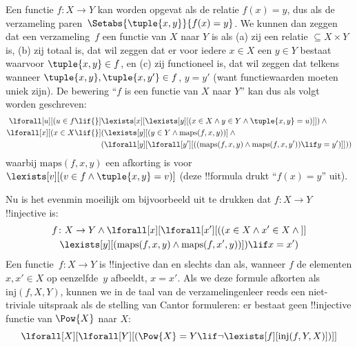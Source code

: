 \documentclass[../../../include/open-logic-section]{subfiles}
\begin{document}
Een functie $f \colon X \to Y$ kan worden opgevat als de relatie $f(x)
= y$, dus als de verzameling paren~$\Setabs{\tuple{x,y}}{f(x) = y}$.
We kunnen dan zeggen dat een verzameling~$f$ een functie van $X$ naar
$Y$ is als (a) zij een relatie $\subseteq X \times Y$ is, (b) zij
totaal is, dat wil zeggen dat er voor iedere $x \in X$ een $y \in Y$
bestaat waarvoor $\tuple{x, y} \in f$, en (c) zij functioneel is, dat
wil zeggen dat telkens wanneer $\tuple{x, y}, \tuple{x, y'} \in f$,
$y = y'$ (want functiewaarden moeten uniek zijn). De bewering ``$f$ is
een functie van $X$ naar $Y$'' kan dus als volgt worden geschreven:
\begin{align*}
 \lforall[u][(u \in f \lif {}] & \lexists[x][\lexists[y][(x \in X \land y \in
      Y \land \tuple{x, y} = u)]]) \land {}\\
 \lforall[x][(x \in X \lif {}] &
      (\lexists[y][(y \in Y \land \mathrm{maps}(f, x, y))] \land {}\\
& (\lforall[y][\lforall[y'][((\mathrm{maps}(f, x, y) \land
    \mathrm{maps}(f, x, y')) \lif y = y')]]))
\end{align*}
waarbij $\mathrm{maps}(f, x, y)$ een afkorting is voor
$\lexists[v][(v \in f \land \tuple{x, y} = v)]$ (deze !!{formula}
drukt ``$f(x) = y$'' uit).

Nu is het evenmin moeilijk om bijvoorbeeld uit te drukken dat
$f\colon X \to Y$ !!{injective} is:
\begin{multline*}
 f \colon X \to Y \land \lforall[x][\lforall[x'][((x \in X \land x' \in
     X \land {}]] \\
 \lexists[y][(\mathrm{maps}(f, x, y) \land \mathrm{maps}(f,
        x', y))]) \lif x = x')
\end{multline*}
Een functie~$f\colon X \to Y$ is !!{injective} dan en slechts dan als,
wanneer $f$ de elementen $x, x' \in X$ op eenzelfde~$y$ afbeeldt,
$x = x'$. Als we deze formule afkorten als $\mathrm{inj}(f, X, Y)$,
kunnen we in de taal van de verzamelingenleer reeds een niet-triviale
uitspraak als de stelling van Cantor formuleren: er bestaat geen
!!{injective} functie van $\Pow{X}$ naar $X$:
\[
\lforall[X][\lforall[Y][(\Pow{X} = Y \lif
    \lnot\lexists[f][\mathrm{inj}(f, Y, X)])]]
\]
\end{document}
